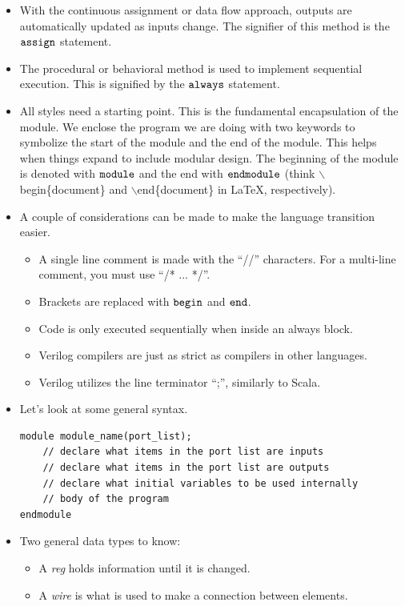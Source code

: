 \documentclass[10pt,a4paper]{article}
\begin{document}
\begin{itemize}
\item With the continuous assignment or data flow approach, outputs are automatically updated as inputs change. The signifier of this method is the $\tt{assign}$ statement.
\item The procedural or behavioral method is used to implement sequential execution. This is signified by the $\tt{always}$ statement.
\item All styles need a starting point. This is the fundamental encapsulation of the module. We enclose the program we are doing with two keywords to symbolize the start of the module and the end of the module. This helps when things expand to include modular design. The beginning of the module is denoted with $\tt{module}$ and the end with $\tt{endmodule}$ (think $\backslash$begin\{document\} and $\backslash$end\{document\} in \LaTeX, respectively).
\item A couple of considerations can be made to make the language transition easier.
\begin{itemize}
\item A single line comment is made with the ``//'' characters. For a multi-line comment, you must use ``/* ... */''.
\item Brackets are replaced with $\tt{begin}$ and $\tt{end}$. 
\item Code is only executed sequentially when inside an always block.
\item Verilog compilers are just as strict as compilers in other languages.
\item Verilog utilizes the line terminator ``;'', similarly to Scala.
\end{itemize}
\item Let's look at some general syntax.
\begin{lstlisting}
module module_name(port_list);
	// declare what items in the port list are inputs
	// declare what items in the port list are outputs
	// declare what initial variables to be used internally
	// body of the program
endmodule
\end{lstlisting}
\item Two general data types to know:
\begin{itemize}
\item A \textit{reg} holds information until it is changed.
\item A \textit{wire} is what is used to make a connection between elements.
\end{itemize}
\end{itemize}
\end{document}
